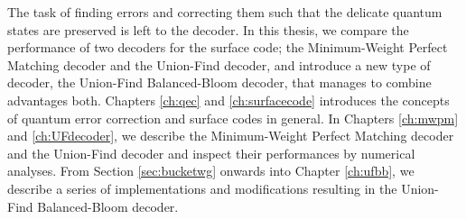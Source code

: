 The task of finding errors and correcting them such that the delicate quantum states are preserved is left to the decoder. In this thesis, we compare the performance of two decoders for the surface code; the Minimum-Weight Perfect Matching decoder and the Union-Find decoder, and introduce a new type of decoder, the Union-Find Balanced-Bloom decoder, that manages to combine advantages both. Chapters \ref{ch:qec} and \ref{ch:surfacecode} introduces the concepts of quantum error correction and surface codes in general. In Chapters \ref{ch:mwpm} and \ref{ch:UFdecoder}, we describe the Minimum-Weight Perfect Matching decoder and the Union-Find decoder and inspect their performances by numerical analyses. From Section \ref{sec:bucketwg} onwards into Chapter \ref{ch:ufbb}, we describe a series of implementations and modifications resulting in the Union-Find Balanced-Bloom decoder. 